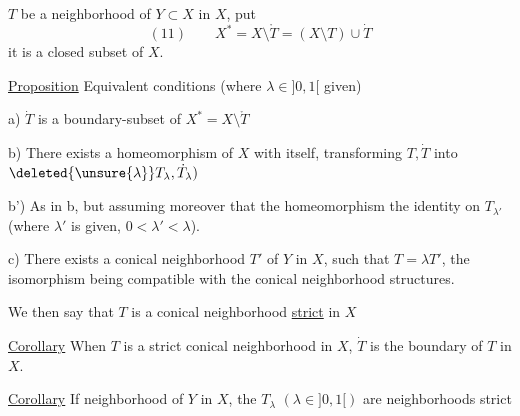  $T$ be a neighborhood
 of $Y\subset X$
in $X$, put
\[
(11)\qquad X^*=X\setminus\mathring T=(X\setminus T)\cup\dot T
\]
it is a closed subset of $X$. 

\uline{Proposition} Equivalent conditions (where $\lambda\in]0,1[$ given)

a) $\dot T$ is a boundary-subset of $X^*=X\setminus\mathring T$

b) There exists a homeomorphism of $X$
with itself, transforming $T,\dot T$ into
$\deleted{\unsure{\lambda}}T_\lambda,\dot T_\lambda)$

b') As in b, but assuming moreover
that the homeomorphism  the identity
on $T_{\lambda'}$ (where 
$\lambda'$ is given, $0<\lambda'<\lambda$).

c) There exists a  conical neighborhood $T'$
of $Y$ in $X$,  such that $T=\lambda T'$,
the isomorphism being compatible with the
conical neighborhood structures.

We then say that $T$ is a  conical neighborhood
\uline{strict} in $X$


\uline{Corollary} When $T$ is a strict  conical neighborhood in $X$,
$\dot T$ is the boundary of $T$ in $X$.

\uline{Corollary} If 
 neighborhood
 of $Y$
in $X$, the $T_\lambda$ $(\lambda\in]0,1[)$ are neighborhoods
 strict
